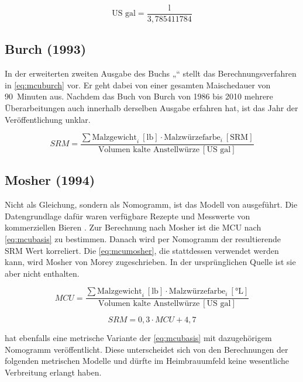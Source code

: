 \documentclass[a4paper,parskip=half]{scrartcl}
\newcommand{\MCUL}{\mathit{MCU}}
\newcommand{\SRM}{\mathit{SRM}}
\newcommand{\ulovi}{\:[\textrm{°L}]}
\newcommand{\usrm}{\:[\textrm{SRM}]}
\newcommand{\ugal}{\:[\textrm{US gal}]}
\newcommand{\ulb}{\:[\textrm{lb}]}
\begin{document}
\begin{equation}
\text{US gal} = \frac{\text{l}}{3,785411784}
\label{eq:ltogal}
\end{equation}

\subsection*{Burch (1993)}

In der erweiterten zweiten Ausgabe des Buchs „“ stellt \textcite[102]{Burch2010} das Berechnungsverfahren in \autoref{eq:mcuburch} vor. Er geht dabei von einer gesamten Maischedauer von 90~Minuten aus. Nachdem das Buch von Burch von 1986 bis 2010 mehrere Überarbeitungen auch innerhalb derselben Ausgabe erfahren hat, ist das Jahr der Veröffentlichung unklar.

\begin{equation}
\SRM = \frac{\sum \text{Malzgewicht}_i \ulb \cdot \text{Malzwürzefarbe}_i \usrm}{\text{Volumen kalte Anstellwürze} \ugal} 
\label{eq:mcuburch}
\end{equation}

\subsection*{Mosher (1994)}

Nicht als Gleichung, sondern als Nomogramm, ist das Modell von \textcite[34]{Mosher1994} ausgeführt. Die Datengrundlage dafür waren verfügbare Rezepte und Messwerte von kommerziellen Bieren \parencite{Morey2004}. Zur Berechnung nach Mosher ist die MCU nach \autoref{eq:mcubasis} zu bestimmen. Danach wird per Nomogramm der resultierende SRM Wert korreliert. Die \autoref{eq:mcumosher}, die stattdessen verwendet werden kann, wird Mosher von Morey zugeschrieben. In der ursprünglichen Quelle ist sie aber nicht enthalten. 

\begin{equation}
\MCUL = \frac{\sum \text{Malzgewicht}_i \ulb \cdot \text{Malzwürzefarbe}_i \ulovi}{\text{Volumen kalte Anstellwürze} \ugal} 
\label{eq:mcubasis}
\end{equation}

\begin{equation}
\SRM = 0,3 \cdot \MCUL + 4,7
\label{eq:mcumosher}
\end{equation}

\textcite[258]{Mosher2015} hat ebenfalls eine metrische Variante der \autoref{eq:mcubasis} mit dazugehörigem Nomogramm veröffentlicht. Diese unterscheidet sich von den Berechnungen der folgenden metrischen Modelle und dürfte im Heimbrauumfeld keine wesentliche Verbreitung erlangt haben.
\end{document}
